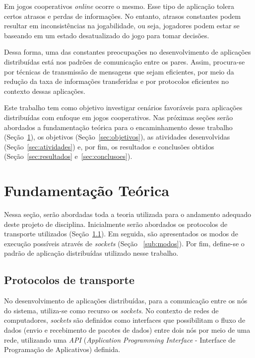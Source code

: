 \documentclass[12pt]{article}
\begin{document}
Em jogos cooperativos \textit{online} ocorre o mesmo. Esse tipo de aplicação
tolera certos atrasos e perdas de informações. No entanto, atrasos constantes
podem resultar em inconsistências na jogabilidade, ou seja, jogadores podem
estar se baseando em um estado desatualizado do jogo para tomar decisões.

Dessa forma, uma das constantes preocupações no desenvolvimento de aplicações
distribuídas está nos padrões de comunicação entre os pares. Assim,
procura-se por técnicas de transmissão de mensagens que sejam eficientes, por
meio da redução da taxa de informações transferidas e por protocolos eficientes
no contexto dessas aplicações.

Este trabalho tem como objetivo investigar cenários favoráveis para aplicações
distribuídas com enfoque em jogos cooperativos. Nas próximas seções serão
abordados a fundamentação teórica para o encaminhamento desse trabalho
(Seção~\ref{sec:fundamentacao}), os objetivos (Seção~\ref{sec:objetivos}), as
atividades desenvolvidas (Seção~\ref{sec:atividades}) e, por fim, os resultados
e conclusões obtidos (Seção~\ref{sec:resultados} e~\ref{sec:conclusoes}).

\section{Fundamentação Teórica} \label{sec:fundamentacao}

Nessa seção, serão abordadas toda a teoria utilizada para o andamento adequado
deste projeto de disciplina. Inicialmente serão abordados os protocolos de
transporte utilizados (Seção~\ref{sub:protocolos}). Em seguida, são
apresentados os modos de execução possíveis através de \textit{sockets} (Seção
~\ref{sub:modos}). Por fim, define-se o padrão de aplicação distribuídas
utilizado nesse trabalho.

\subsection{Protocolos de transporte} \label{sub:protocolos}

No desenvolvimento de aplicações distribuídas, para a comunicação entre os nós
do sistema, utiliza-se como recurso os \emph{sockets}. No contexto de redes de
computadores, \emph{sockets} são definidos como interfaces que possibilitam o
fluxo de dados (envio e recebimento de pacotes de dados) entre dois nós por
meio de uma rede, utilizando uma \emph{API} (\emph{Application Programming
Interface} - Interface de Programação de Aplicativos) definida.
\end{document}
